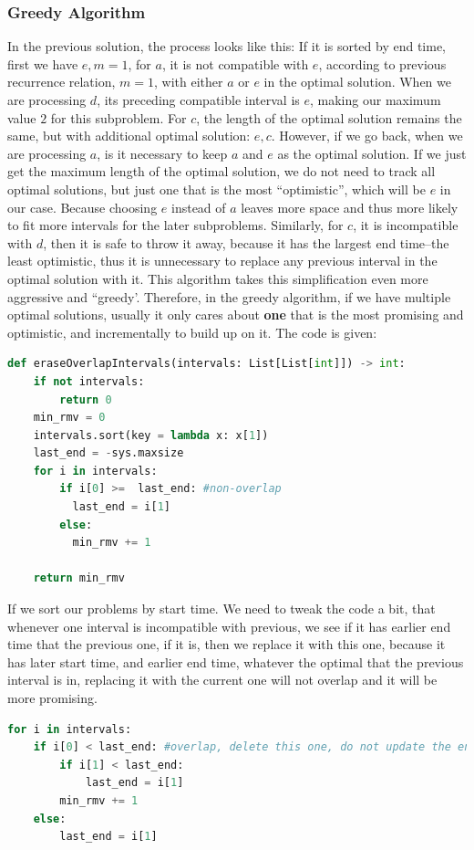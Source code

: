 \documentclass[../main.tex]{subfiles}
\begin{document}
\subsubsection{Greedy Algorithm} 
In the previous solution, the process looks like this: If it is sorted by end time, first we have $e, m = 1$, for $a$, it is not compatible with $e$, according to previous recurrence relation, $m=1$, with either $a$ or $e$ in the optimal solution. When we are processing $d$, its preceding compatible interval is $e$, making our maximum value $2$ for this subproblem. For $c$, the length of the optimal solution remains the same, but with additional optimal solution: $e, c$. 
However, if we go back, when we are processing $a$, is it necessary to keep $a$ and $e$ as the optimal solution. If we just get the maximum length of the optimal solution, we do not need to track all optimal solutions, but just one that is the most ``optimistic'', which will be $e$ in our case. Because choosing $e$ instead of $a$ leaves more space  and thus more likely to fit more intervals for the later subproblems. Similarly, for $c$, it is incompatible with $d$, then it is safe to throw it away, because it has the largest end time--the least optimistic, thus it is unnecessary to replace any previous interval in the optimal solution with it. This algorithm  takes this simplification even more aggressive and ``greedy'. Therefore, in the greedy algorithm, if we have multiple optimal solutions, usually it only cares about \textbf{one} that is the most promising and optimistic, and incrementally to build up on it. The code is given:
\begin{lstlisting}[language=Python]
def eraseOverlapIntervals(intervals: List[List[int]]) -> int:
    if not intervals:
        return 0
    min_rmv = 0
    intervals.sort(key = lambda x: x[1])
    last_end = -sys.maxsize
    for i in intervals:
        if i[0] >=  last_end: #non-overlap
          last_end = i[1]            
        else:
          min_rmv += 1
           
    return min_rmv
\end{lstlisting}
If we sort our problems by start time. We need to tweak the code a bit, that whenever one interval is incompatible with previous, we see if it has earlier end time that the previous one, if it is, then we replace it with this one, because it has later start time, and earlier end time, whatever the optimal that the previous interval is in, replacing it with the current one will not overlap and it will be more promising.
\begin{lstlisting}[language=Python]
for i in intervals:
    if i[0] < last_end: #overlap, delete this one, do not update the end
        if i[1] < last_end:
            last_end = i[1]
        min_rmv += 1
    else:
        last_end = i[1]
\end{lstlisting}
\end{document}
